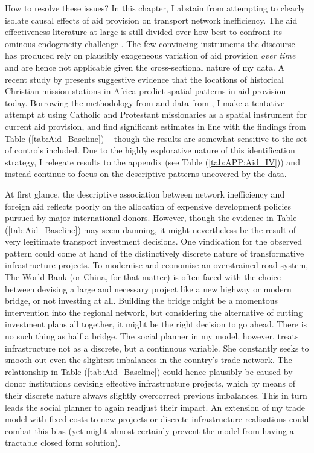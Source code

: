\documentclass[11pt, oneside]{article}   	%
\let\oldref\ref
\renewcommand{\ref}[1]{(\oldref{#1})}
\begin{document}
How to resolve these issues? In this chapter, I abstain from attempting to clearly isolate causal effects of aid provision on transport network inefficiency. The aid effectiveness literature at large is still divided over how best to confront its ominous endogeneity challenge \citep{Clemens_CountingChickenswhen_2012}. The few convincing instruments the discourse has produced rely on plausibly exogeneous variation of aid provision \emph{over time} \citep{Nunn_USFoodAid_2014,Dreher_AidChinaGrowth_2017,Galiani_effectaidgrowth_2017} and are hence not applicable given the cross-sectional nature of my data. A recent study by \cite{Alpino_LightingPathInfluence_2017} presents suggestive evidence that the locations of historical Christian mission stations in Africa predict spatial patterns in aid provision today. Borrowing the methodology from \cite{Castello-Climent_HigherEducationProsperity_2017} and data from \cite{Nunn_ReligiousConversionColonial_2010}, I make a tentative attempt at using Catholic and Protestant missionaries as a spatial instrument for current aid provision, and find significant estimates in line with the findings from Table \ref{tab:Aid_Baseline} -- though the results are somewhat sensitive to the set of controls included. Due to the highly explorative nature of this identification strategy, I relegate results to the appendix (see Table \ref{tab:APP:Aid_IV}) and instead continue to focus on the descriptive patterns uncovered by the data.

At first glance, the descriptive association between network inefficiency and foreign aid reflects poorly on the allocation of expensive development policies pursued by major international donors. However, though the evidence in Table \ref{tab:Aid_Baseline} may seem damning, it might nevertheless be the result of very legitimate transport investment decisions. One vindication for the observed pattern could come at hand of the distinctively discrete nature of transformative infrastructure projects. To modernise and economise an overstrained road system, The World Bank (or China, for that matter) is often faced with the choice between devising a large and necessary project like a new highway or modern bridge, or not investing at all. Building the bridge might be a momentous intervention into the regional network, but considering the alternative of cutting investment plans all together, it might be the right decision to go ahead. There is no such thing as half a bridge. The social planner in my model, however, treats infrastructure not as a discrete, but a continuous variable. She constantly seeks to smooth out even the slightest imbalances in the country's trade network. The relationship in Table \ref{tab:Aid_Baseline} could hence plausibly be caused by donor institutions devising effective infrastructure projects, which by means of their discrete nature always slightly overcorrect previous imbalances. This in turn leads the social planner to again readjust their impact. An extension of my trade model with fixed costs to new projects or discrete infrastructure realisations could combat this bias (yet might almost certainly prevent the model from having a tractable closed form solution).
\end{document}

